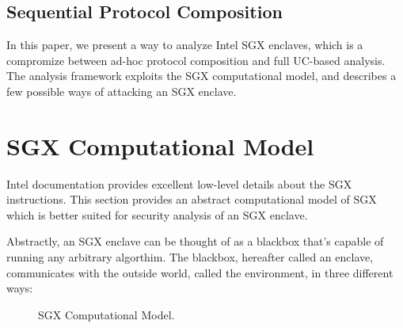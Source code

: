 \documentclass[10pt]{article}
\newcommand{\env}{\textsf{environment}}
\newcommand{\uc}{\textsf{UC}}
\begin{document}
  \subsection{Sequential Protocol Composition}

  In this paper, we present a way to analyze Intel SGX enclaves, which is
  a compromize between ad-hoc protocol composition and full \uc-based 
  analysis. The analysis framework exploits the SGX computational model, and 
  describes a few possible ways of attacking an SGX enclave.

  \section{SGX Computational Model}
  \label{sec:model}
  Intel documentation\cite{intelsdm} provides excellent low-level
  details about the SGX instructions. This section provides an
  abstract computational model of SGX which is better suited for
  security analysis of an SGX enclave.

  Abstractly, an SGX enclave can be thought of as a blackbox that's
  capable of running any arbitrary algorthim. The blackbox, hereafter
  called an enclave, communicates with the outside world, called the
  \env, in three different ways:

  \begin{figure}[h]
  \centering
  
  \caption{SGX Computational Model.}
  \label{fig:model}
  \end{figure}
\end{document}
